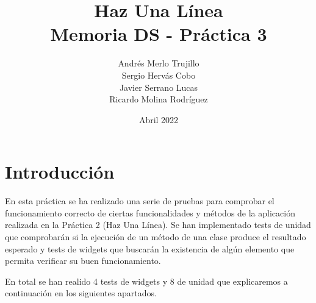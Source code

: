 \documentclass{article}
\title{Haz Una Línea\\
\large Memoria DS - Práctica 3}
\author{Andrés Merlo Trujillo\\ Sergio Hervás Cobo\\ Javier Serrano Lucas\\ Ricardo Molina Rodríguez}
\begin{document}
\date{Abril 2022}
\maketitle
\section{Introducción}
En esta práctica se ha realizado una serie de pruebas para comprobar el funcionamiento correcto de
ciertas funcionalidades y métodos de la aplicación realizada en la Práctica 2 (Haz Una Línea). Se han implementado
tests de unidad que comprobarán si la ejecución de un método de una clase produce el resultado
esperado y tests de widgets que buscarán la existencia de algún elemento que permita verificar su buen funcionamiento.

En total se han realido 4 tests de widgets y 8 de unidad que explicaremos a continuación en los siguientes apartados.
\end{document}
